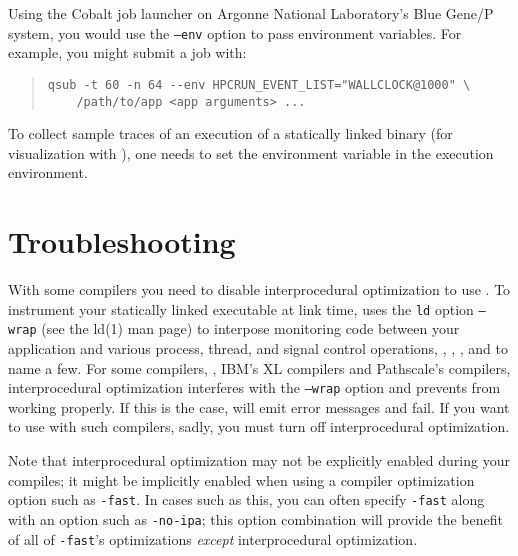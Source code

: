 \documentclass[11pt,letterpaper]{report}
\begin{document}
Using the Cobalt job launcher on Argonne National Laboratory's Blue Gene/P system, you would use the \texttt{--env} option to pass environment variables.
For example, you might submit a job with:
\begin{quote}
\begin{verbatim}
qsub -t 60 -n 64 --env HPCRUN_EVENT_LIST="WALLCLOCK@1000" \
    /path/to/app <app arguments> ...
\end{verbatim}
\end{quote}

To collect sample traces of  an execution of a statically linked binary (for visualization with \hpctraceviewer{}), one needs to set the environment variable  in the execution environment.



\section{Troubleshooting}

With some compilers you need to disable interprocedural optimization to use \hpclink{}.
To instrument your statically linked executable at link time, \hpclink{} uses the \texttt{ld} option \texttt{--wrap} (see the ld(1) man page) to interpose monitoring code between your application and various process, thread, and signal control operations, \eg{}, , , and  to name a few.
For some compilers, \eg{}, IBM's XL compilers and Pathscale's compilers, interprocedural optimization interferes with the \texttt{--wrap} option and prevents \hpclink{} from working properly.
If this is the case, \hpclink{} will emit error messages and fail.
If you want to use \hpclink{} with such compilers, sadly, you must turn off interprocedural optimization.

Note that interprocedural optimization may not be explicitly enabled during your compiles; it might be implicitly enabled when using a compiler optimization option such as \texttt{-fast}.
In cases such as this, you can often specify \texttt{-fast} along with an option such as \texttt{-no-ipa}; this option combination will provide the benefit of all of \texttt{-fast}'s optimizations {\em except} interprocedural optimization.


\end{document}
